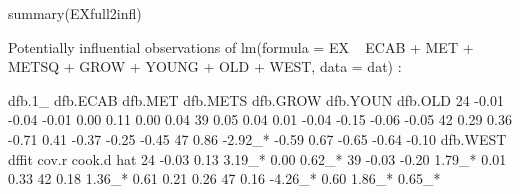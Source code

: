 \begin{Schunk}
\begin{Sinput}
 summary(EXfull2infl)
\end{Sinput}
\begin{Soutput}
Potentially influential observations of
	 lm(formula = EX ~ ECAB + MET + METSQ + GROW + YOUNG + OLD + WEST,      data = dat) :

   dfb.1_ dfb.ECAB dfb.MET dfb.METS dfb.GROW dfb.YOUN dfb.OLD
24 -0.01  -0.04    -0.01    0.00     0.11     0.00     0.04  
39  0.05   0.04     0.01   -0.04    -0.15    -0.06    -0.05  
42  0.29   0.36    -0.71    0.41    -0.37    -0.25    -0.45  
47  0.86  -2.92_*  -0.59    0.67    -0.65    -0.64    -0.10  
   dfb.WEST dffit   cov.r   cook.d  hat    
24 -0.03     0.13    3.19_*  0.00    0.62_*
39 -0.03    -0.20    1.79_*  0.01    0.33  
42  0.18     1.36_*  0.61    0.21    0.26  
47  0.16    -4.26_*  0.60    1.86_*  0.65_*
\end{Soutput}
\end{Schunk}
